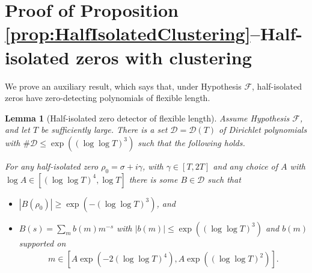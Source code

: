 \documentclass[12pt]{amsart}
\theoremstyle{plain}
\newtheorem{lemma}[theorem]{Lemma}
\theoremstyle{definition}
\theoremstyle{remark}
\begin{document}
\section{Proof of Proposition \ref{prop:HalfIsolatedClustering}--Half-isolated zeros with clustering}\label{sec:ClusteringBound}
%
%
%
%
We prove an auxiliary result, which says that, under Hypothesis $\mathcal{F}$, half-isolated zeros have zero-detecting polynomials of flexible length.
%
%
%
%
\begin{lemma}[Half-isolated zero detector of flexible length]\label{lem:GoodLengthForHIZeros}
Assume Hypothesis $\mathcal{F}$, and let $T$ be sufficiently large. There is a set $\mathcal{D} = \mathcal{D}(T)$ of Dirichlet polynomials with $\#\mathcal{D} \leq \exp((\log \log T)^3)$ such that the following holds.

For any half-isolated zero $\rho_0 = \sigma+i\gamma$, with $\gamma \in [T,2T]$ and any choice of $A$ with $\log{A}\in[(\log \log T)^4 ,\log T]$ there is some $B \in \mathcal{D}$ such that
\begin{itemize}
\item $|B(\rho_0)| \geq \exp(-(\log \log T)^3)$, and
\item $B(s) = \sum_m b(m) m^{-s}$ with $|b(m)| \leq \exp((\log \log T)^3)$ and $b(m)$ supported on
\begin{align*}
m \in [A\exp(-2(\log \log T)^4),A\exp((\log \log T)^2)].
\end{align*}
\end{itemize}
\end{lemma}
\end{document}
